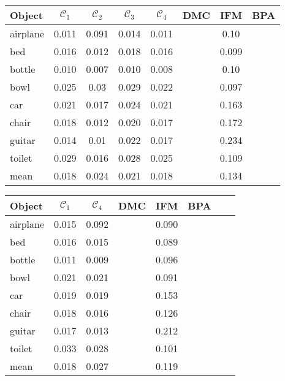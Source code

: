 \begin{center}
     \label{tab:distance1024} 
    \begin{tabular}{| l  | c | c | c | c | c | c | c |}
        \hline
        Object& $\mathcal{C}_1$ & $\mathcal{C}_2$ & $\mathcal{C}_3$ & $\mathcal{C}_4$ & DMC & IFM & BPA \\ \hline
        \multirow{1}{*}{airplane}&0.011&0.091&0.014&0.011&&0.10&\\\hline
        \multirow{1}{*}{bed}&0.016&0.012&0.018&0.016&&0.099&\\        \hline
        \multirow{1}{*}{bottle}&0.010&0.007&0.010&0.008&&0.10&\\        \hline
        \multirow{1}{*}{bowl}&0.025&0.03&0.029&0.022&&0.097&\\        \hline
        \multirow{1}{*}{car}&0.021&0.017&0.024&0.021&&0.163&\\        \hline
        \multirow{1}{*}{chair}&0.018&0.012&0.020&0.017&&0.172&\\        \hline
        \multirow{1}{*}{guitar}&0.014&0.01&0.022&0.017&&0.234&\\        \hline
        \multirow{1}{*}{toilet}&0.029&0.016&0.028&0.025&&0.109&\\        \hline\hline
        \multirow{1}{*}{mean}&0.018&0.024&0.021&0.018&&0.134&\\        \hline
    \end{tabular}
\end{center}
\begin{center}
     \label{tab:distance1024} 
    \begin{tabular}{| l  | c | c | c | c | c | c | c |}
        \hline
        Object& $\mathcal{C}_1$ & $\mathcal{C}_4$ & DMC & IFM & BPA \\ \hline
        \multirow{1}{*}{airplane}&0.015&0.092&&0.090&\\\hline
        \multirow{1}{*}{bed}&0.016&0.015&&0.089&\\\hline
        \multirow{1}{*}{bottle}&0.011&0.009&&0.096&\\\hline
        \multirow{1}{*}{bowl}&0.021&0.021&&0.091&\\\hline
        \multirow{1}{*}{car}&0.019&0.019&&0.153&\\\hline
        \multirow{1}{*}{chair}&0.018&0.016&&0.126&\\\hline
        \multirow{1}{*}{guitar}&0.017&0.013&&0.212&\\\hline
        \multirow{1}{*}{toilet}&0.033&0.028&&0.101&\\\hline\hline
        \multirow{1}{*}{mean}&0.018&0.027&&0.119&\\\hline
    \end{tabular}
\end{center}

